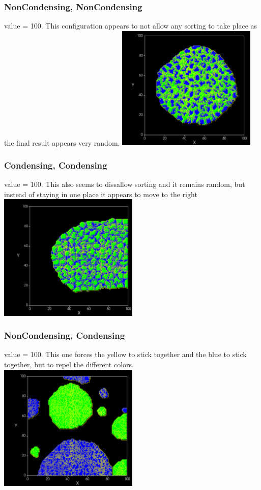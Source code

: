 \documentclass{article}
\begin{document}
\subsubsection{NonCondensing, NonCondensing}
value = 100.  This configuration appears to not allow any sorting to take place as the final result appears very random.
    \includegraphics[width=0.5\textwidth]{nC_nC100}
    
\subsubsection{Condensing, Condensing}
value = 100.  This also seems to dissallow sorting and it remains random, but instead of staying in one place it appears to move to the right
    \includegraphics[width=0.5\textwidth]{c_c100}
    
\subsubsection{NonCondensing, Condensing}
value = 100.  This one forces the yellow to stick together and the blue to stick together, but to repel the different colors.
    \includegraphics[width=0.5\textwidth]{nC_c100}
    
\end{document}
